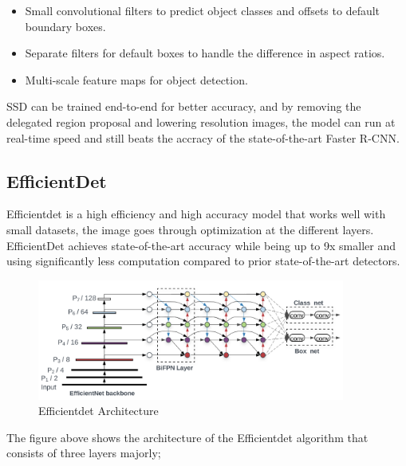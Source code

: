 \documentclass[12pt]{report}
\begin{document}
\begin{itemize}[topsep=0pt]

\item Small convolutional filters to predict object classes and offsets to default boundary boxes.

\item Separate filters for default boxes to handle the difference in aspect ratios.

\item Multi-scale feature maps for object detection.
\end{itemize}

SSD can be trained end-to-end for better accuracy, and by removing the delegated region proposal and lowering resolution images, the model can run at real-time speed and still beats the accracy of the state-of-the-art Faster R-CNN\cite{CNN}.

\subsection{EfficientDet}
Efficientdet is a  high efficiency and high accuracy model that works well with small datasets, the image goes through optimization at the different layers. EfficientDet achieves state-of-the-art accuracy while being up to 9x smaller and using significantly less computation compared to prior state-of-the-art detectors\cite{Efficientdet}.


\begin{figure}[h!]\includegraphics[width=0.9\textwidth]{efficient.png}\caption{Efficientdet Architecture\cite{Efficientdet} }\label{fig:Efficientet} \end{figure}%


 The figure above shows the architecture of the Efficientdet algorithm that consists of three layers  majorly;
\end{document}
